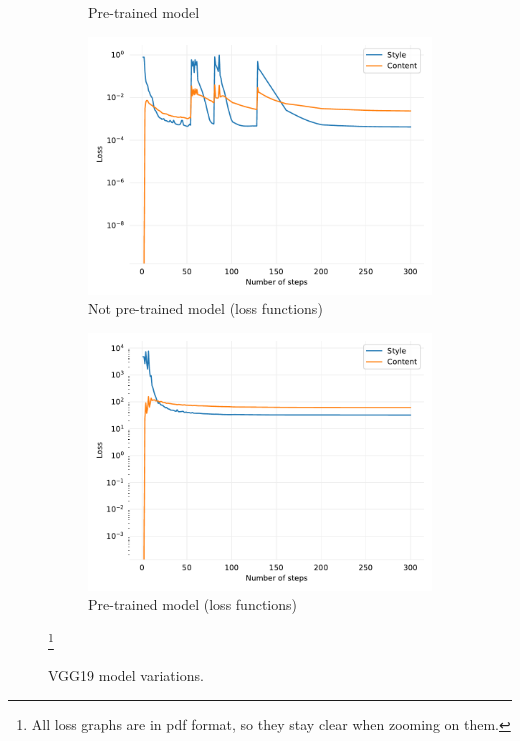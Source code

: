 \documentclass[twocolumn,superscriptaddress,aps,floatfix, nofootinbib]{revtex4-1}
\begin{document}
\begin{figure}[ht]
\begin{subfigure}[b]{0.22\textwidth}
            \caption{Pre-trained model}
        \end{subfigure}
         \begin{subfigure}[b]{0.22\textwidth}
             \centering
             \includegraphics[width=\textwidth]{resources/pdf/model/sun-trees-paris-notpretrained.pdf}
             \caption{Not pre-trained model (loss functions)}
         \end{subfigure}
         \hfill
         \begin{subfigure}[b]{0.22\textwidth}
             \centering
             \includegraphics[width=\textwidth]{resources/pdf/model/sun-trees-paris-pretrained.pdf}
             \caption{Pre-trained model (loss functions)}
         \end{subfigure}
        \caption{VGG19 model variations.}\footnote{All loss graphs are in pdf format, so they stay clear when zooming on them.}
        \label{fig:model.pretrained.variations}
    \end{figure}
    
\end{document}
